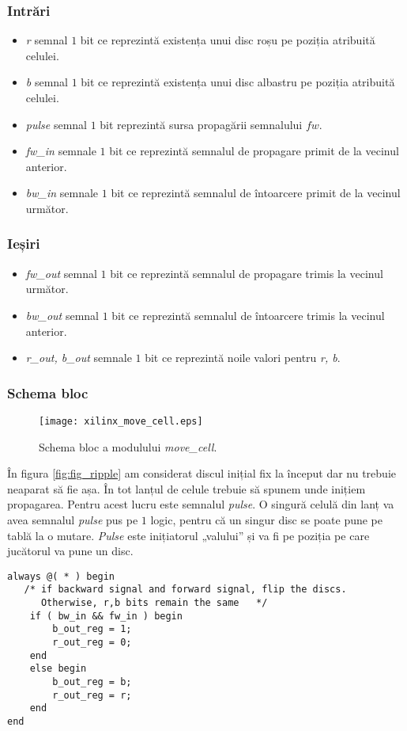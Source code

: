 \documentclass[12pt,twoside,a4paper,fleqn]{book}
\theoremstyle{definition}
\begin{document}
\subsubsection{Intrări}
\begin{itemize}
\item \emph{r} semnal $1$ bit ce reprezintă existența unui disc roșu pe poziția atribuită celulei.
\item \emph{b} semnal $1$ bit ce reprezintă existența unui disc albastru pe poziția atribuită celulei.
\item \emph{pulse} semnal $1$ bit reprezintă sursa propagării semnalului $fw$.
\item \emph{fw\_in} semnale $1$ bit ce reprezintă semnalul de propagare primit de la vecinul anterior.
\item \emph{bw\_in} semnale $1$ bit ce reprezintă semnalul de întoarcere primit de la vecinul următor.
\end{itemize}

\subsubsection{Ieșiri}
\begin{itemize}
\item \emph{fw\_out} semnal $1$ bit ce reprezintă semnalul de propagare trimis la vecinul următor.
\item \emph{bw\_out} semnal $1$ bit ce reprezintă semnalul de întoarcere trimis la vecinul anterior.
\item \emph{r\_out, b\_out} semnale $1$ bit ce reprezintă noile valori pentru \emph{r, b}. 
\end{itemize}

\subsubsection{Schema bloc}
\begin{figure}[h]
\texttt{[image: xilinx\_move\_cell.eps]}
\caption{\small{Schema bloc a modulului \emph{move\_cell}.}}
\label{fig:fig_move_cell}
\end{figure}

În figura \ref{fig:fig_ripple} am considerat discul inițial fix la început dar nu trebuie neaparat să fie așa. În tot lanțul de celule trebuie să spunem unde inițiem propagarea. Pentru acest lucru este semnalul \emph{pulse}. O singură celulă din lanț va avea semnalul \emph{pulse} pus pe $1$ logic, pentru că un singur disc se poate pune pe tablă la o mutare. \emph{Pulse} este inițiatorul „valului” și va fi pe poziția pe care jucătorul va pune un disc.
\begin{fragmentsursa}
\begin{verbatim}
always @( * ) begin
   /* if backward signal and forward signal, flip the discs. 
      Otherwise, r,b bits remain the same	*/
    if ( bw_in && fw_in ) begin
        b_out_reg = 1;
        r_out_reg = 0;
    end
    else begin
        b_out_reg = b;
        r_out_reg = r;
    end
end
\end{verbatim}
\caption{Procesul combinațional pentru \emph{move\_cell}}
\end{fragmentsursa}
\end{document}

